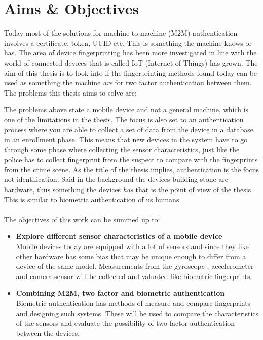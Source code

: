 \section{Aims \& Objectives}\label{sec:aim}
Today most of the solutions for machine-to-machine (M2M) authentication involves a certificate, token, UUID etc. This is something the machine knows or has. The area of device fingerprinting has been more investigated in line with the world of connected devices that is called IoT (Internet of Things) has grown. The aim of this thesis is to look into if the fingerprinting methods found today can be used as something the machine \textit{are} for two factor authentication between them. The problems this thesis aims to solve are:
The problems above state a mobile device and not a general machine, which is one of the limitations in the thesis. The focus is also set to an authentication process where you are able to collect a set of data from the device in a database in an enrollment phase. This means that new devices in the system have to go through some phase where collecting the sensor characteristics, just like the police has to collect fingerprint from the suspect to compare with the fingerprints from the crime scene. As the title of the thesis implies, authentication is the focus not identification. Said in the background the devices building stone are hardware, thus something the devices \textit{has} that is the point of view of the thesis. This is similar to biometric authentication of us humans. \\
\\
The objectives of this work can be summed up to:
\begin{itemize}
	\item[] \textbf{Explore different sensor characteristics of a mobile device} \\
	Mobile devices today are equipped with a lot of sensors and since they like other hardware has some bias that may be unique enough to differ from a device of the same model. Measurements from the gyroscope-, accelerometer- and camera-sensor will be collected and valuated like biometric fingerprints.
	\item[] \textbf{Combining M2M, two factor and biometric authentication} \\
	Biometric authentication has methods of measure and compare fingerprints and designing such systems. These will be used to compare the characteristics of the sensors and evaluate the possibility of two factor authentication between the devices.
\end{itemize}

